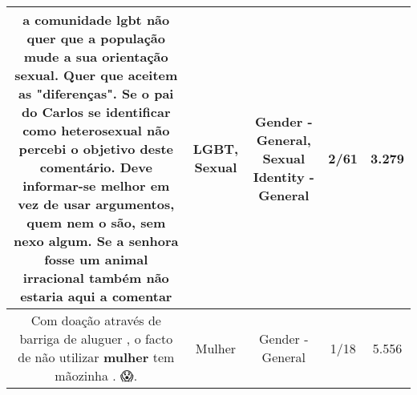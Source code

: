 \documentclass[11pt]{article}
\newlength\mylength
\begin{document}
\begin{center}
\begin{longtable}{|C{.65\mylength}|C{.30\mylength}|C{.12\mylength}|C{.12\mylength}|C{.12\mylength}|}
  \small a comunidade \textbf{lgbt} não quer que a população mude a sua orientação \textbf{sexual}. Quer que aceitem as "diferenças". Se o pai do Carlos se identificar como heterosexual não percebi o objetivo deste comentário. Deve informar-se melhor em vez de usar argumentos, quem nem o são, sem nexo algum. Se a senhora fosse um animal irracional também não estaria aqui a comentar\normalsize   & LGBT, Sexual & Gender - General, Sexual Identity - General & 2/61 & 3.279 \\  \hline
  \small Com doação através de barriga de aluguer , o facto de não utilizar \textbf{mulher} tem mãozinha . 😱.\normalsize   & Mulher & Gender - General & 1/18 & 5.556 \\  \hline
  
\end{longtable}
\end{center}
\end{document}
